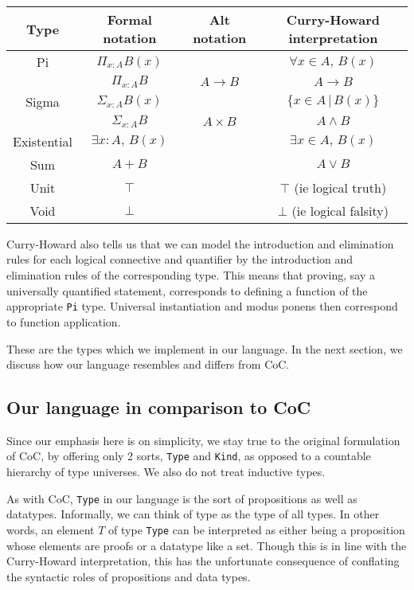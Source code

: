 \documentclass{article}
\begin{document}
\begin{center}
\begin{tabular}{|c|c|c|c|}
  \hline
 Type & Formal notation & Alt notation & Curry-Howard interpretation \\ 
 \hline
 Pi & $\Pi_{x : A}B(x)$ & & $\forall x \in A, \, B(x)$ \\  
    & $\Pi_{x : A}B$ & $A \rightarrow B$ & $A \rightarrow B$ \\  
    \hline
 Sigma
       & $\Sigma_{x : A}B(x)$ & & $\{ x \in A \, | \, B(x) \}$ \\
       & $\Sigma_{x : A}B$ & $A \times B$ & $A \wedge B$ \\
 \hline
 Existential & $\exists x : A, \, B(x)$ & & $\exists x \in A, \, B(x)$ \\
 \hline
 Sum & $A + B$ & & $A \vee B$ \\
 \hline
 Unit & $\top$ & & $\top$ (ie logical truth) \\
 \hline
 Void & $\bot$ & & $\bot$ (ie logical falsity) \\
 \hline
\end{tabular}
\end{center}

Curry-Howard also tells us that we can model the introduction and elimination
rules for each logical connective and quantifier by the introduction and elimination
rules of the corresponding type. This means that proving, say a universally
quantified statement, corresponds to defining a function of the appropriate
\verb|Pi| type. Universal instantiation and modus ponens then correspond to
function application.

These are the types which we implement in our language.
In the next section, we discuss how our language resembles and differs from
CoC.

\subsection{Our language in comparison to CoC}
Since our emphasis here is on simplicity, we stay true to the original
formulation of CoC, by offering only 2 sorts, \verb|Type| and \verb|Kind|, as
opposed to a countable hierarchy of type universes. We also do not treat inductive
types.

As with CoC, \verb|Type| in our language is the sort of propositions as well as 
datatypes. Informally, we can think of type as the type of all types.
In other words, an element $T$ of type \verb|Type| can be interpreted as either
being a proposition whose elements are proofs or a datatype like a set.
Though this is in line with the Curry-Howard interpretation, this has the
unfortunate consequence of conflating the syntactic roles of propositions and
data types.
  
\end{document}
